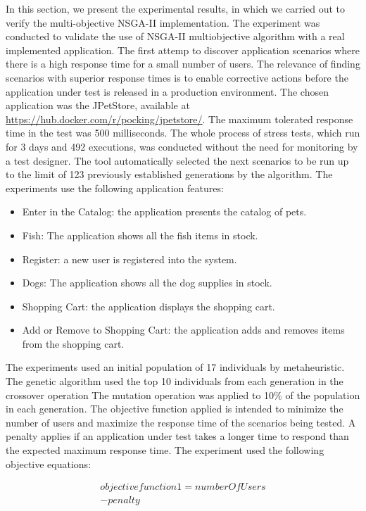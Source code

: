 \documentclass[espaco=umemeio,chapter=TITLE,twoside,openright]{abnt}
\begin{document}
In this section,  we present the experimental results,  in which we carried out to verify the multi-objective NSGA-II   implementation. The experiment was conducted to validate the use of NSGA-II multiobjective algorithm with a real implemented application. The first attemp to discover application scenarios where there is a high response time for a small number of users. The relevance of finding scenarios with superior response times is to enable corrective actions before the application under test is released in a production environment. The chosen application was the JPetStore, available at \url{https://hub.docker.com/r/pocking/jpetstore/}. The maximum tolerated response time in the test was 500 milliseconds.  The whole process of stress  tests, which run for 3 days and 492 executions,  was conducted without the need for monitoring by a test designer. The tool automatically selected the next scenarios to be run up to the limit of 123 previously established  generations by the algorithm. The experiments use the following application features:


\begin{itemize}
\item Enter in the Catalog: the application presents the catalog of pets.
\item Fish: The application shows all the fish items in stock.
\item Register:  a new user is registered into the system.
\item Dogs: The application shows all the dog supplies in stock.
\item Shopping Cart: the application displays the shopping cart.
\item Add or Remove to Shopping Cart: the application adds and removes items from the shopping cart.
\end{itemize}

The experiments used an initial population of 17 individuals by metaheuristic. The genetic algorithm used the top 10 individuals from each generation in the crossover operation  The mutation operation was applied to 10\% of the population in each generation. The objective function applied is intended to minimize the number of users and maximize the response time of the scenarios being tested. A penalty applies if an application under test takes a longer time to respond than the expected maximum response time. The experiment used the following objective equations:

\begin{equation}
\begin{aligned}
objective function 1 =numberOfUsers\\
-penalty\\
\end{aligned}
\end{equation}
\end{document}
